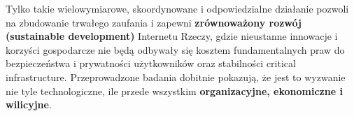Tylko takie wielowymiarowe, skoordynowane i odpowiedzialne działanie pozwoli na zbudowanie trwałego zaufania i zapewni \textbf{zrównoważony rozwój (sustainable development)} Internetu Rzeczy, gdzie nieustanne innowacje i korzyści gospodarcze nie będą odbywały się kosztem fundamentalnych praw do bezpieczeństwa i prywatności użytkowników oraz stabilności critical infrastructure. Przeprowadzone badania dobitnie pokazują, że jest to wyzwanie nie tyle technologiczne, ile przede wszystkim \textbf{organizacyjne, ekonomiczne i wilicyjne}.
